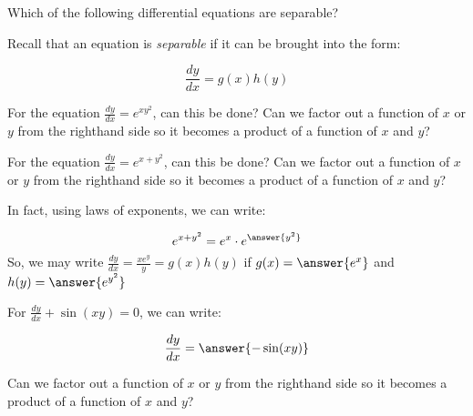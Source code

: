 \documentclass{ximera}
\author{Jim Talamo}
\begin{document}
\begin{exercise}

Which of the following differential equations are separable?

\begin{multipleChoice}
\end{multipleChoice}

\begin{hint}
Recall that an equation is \emph{separable} if it can be brought into the form:

\[
\frac{dy}{dx} = g(x)h(y) 
\]

\begin{question}
For the equation $\frac{dy}{dx} = e^{xy^2}$, can this be done?  Can we factor out a function of $x$ or $y$ from the righthand side so it becomes a product of a function of $x$ and $y$?

\begin{multipleChoice}
\end{multipleChoice}

\end{question}


\begin{question}
For the equation $\frac{dy}{dx} = e^{x+y^2}$, can this be done? Can we factor out a function of $x$ or $y$ from the righthand side so it becomes a product of a function of $x$ and $y$?
\begin{multipleChoice}
\end{multipleChoice}

In fact, using laws of exponents, we can write:

\[
e^{x+y^2} = e^{x} \cdot e^{\answer{y^2}}
\]
So, we may write $\frac{dy}{dx} = \frac{xe^y}{y} = g(x)h(y)$ if $g(x) = \answer{e^x}$ and $h(y) = \answer{e^{y^2}}$
\end{question}
\begin{question}
For $\frac{dy}{dx} + \sin(xy) = 0$, we can write:

\[
\frac{dy}{dx} = \answer{-\sin(xy)}
\]

Can we factor out a function of $x$ or $y$ from the righthand side so it becomes a product of a function of $x$ and $y$?
\begin{multipleChoice}
\end{multipleChoice}


\end{question}
\end{hint}
\end{exercise}
\end{document}
